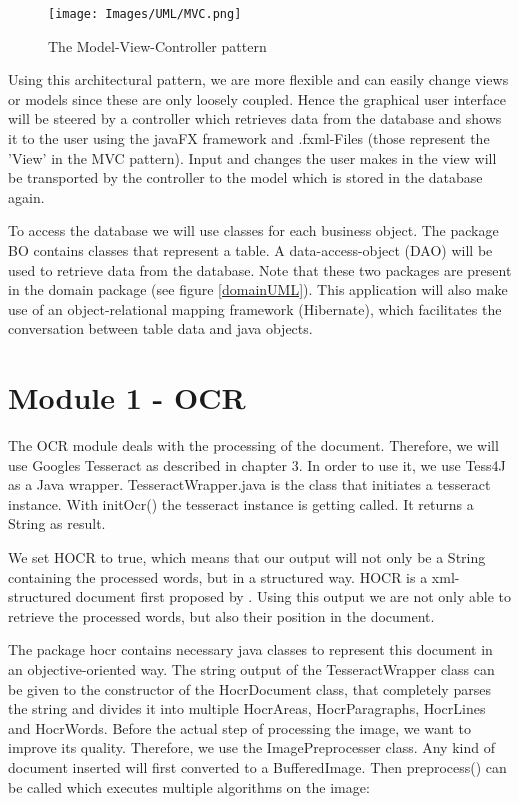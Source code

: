 \begin{figure}[ht!]
\centering
\texttt{[image: Images/UML/MVC.png]}
\caption{The Model-View-Controller pattern \label{MVCpattern}}
\end{figure}

Using this architectural pattern, we are more flexible and can easily change views or models since these are only loosely coupled. Hence the graphical user interface will be steered by a controller which retrieves data from the database and shows it to the user using the javaFX framework and .fxml-Files (those represent the 'View' in the MVC pattern). Input and changes the user makes in the view will be transported by the controller to the model which is stored in the database again.

To access the database we will use classes for each business object. The package BO contains classes that represent a table. A data-access-object (DAO) will be used to retrieve data from the database. Note that these two packages are present in the domain package (see figure \ref{domainUML}).
This application will also make use of an object-relational mapping framework (Hibernate), which facilitates the conversation between table data and java objects.

\section{Module 1 - OCR}
\label{sec5.4}

The OCR module deals with the processing of the document. Therefore, we will use Googles Tesseract as described in chapter 3. In order to use it, we use Tess4J as a Java wrapper. TesseractWrapper.java is the class that initiates a tesseract instance. With initOcr() the tesseract instance is getting called. It returns a String as result. 

We set HOCR to true, which means that our output will not only be a String containing the processed words, but in a structured way. HOCR is a xml-structured document first proposed by \cite{Breuel07}. Using this output we are not only able to retrieve the processed words, but also their position in the document.

The package hocr contains necessary java classes to represent this document in an objective-oriented way. The string output of the TesseractWrapper class can be given to the constructor of the HocrDocument class, that completely parses the string and divides it into multiple HocrAreas, HocrParagraphs, HocrLines and HocrWords.
Before the actual step of processing the image, we want to improve its quality. Therefore, we use the ImagePreprocesser class. Any kind of document inserted will first converted to a BufferedImage. Then preprocess() can be called which executes multiple algorithms on the image:

